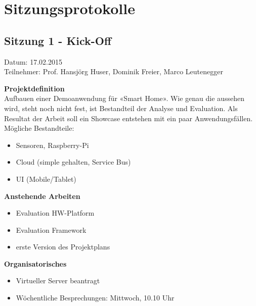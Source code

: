 \chapter{Sitzungsprotokolle}
\label{chap:Sitzungsprotokolle}
\section{Sitzung 1 - Kick-Off}
Datum: 17.02.2015 \\
Teilnehmer: Prof. Hansjörg Huser, Dominik Freier, Marco Leutenegger

\textbf{Projektdefinition} \\
Aufbauen einer Demoanwendung für «Smart Home». Wie genau die aussehen wird, steht noch nicht fest, ist Bestandteil der Analyse und Evaluation. Als Resultat der Arbeit soll ein Showcase entstehen mit ein paar Anwendungsfällen.
Mögliche Bestandteile:
\begin{itemize}
	\item Sensoren, Raspberry-Pi
	\item Cloud (simple gehalten, Service Bus)
	\item UI (Mobile/Tablet)
\end{itemize}

\textbf{Anstehende Arbeiten}
\begin{itemize}
	\item Evaluation HW-Platform
	\item Evaluation Framework
	\item erste Version des Projektplans
\end{itemize}

\textbf{Organisatorisches}

\begin{itemize}
	\item Virtueller Server beantragt
	\item Wöchentliche Besprechungen: Mittwoch, 10.10 Uhr
\end{itemize}